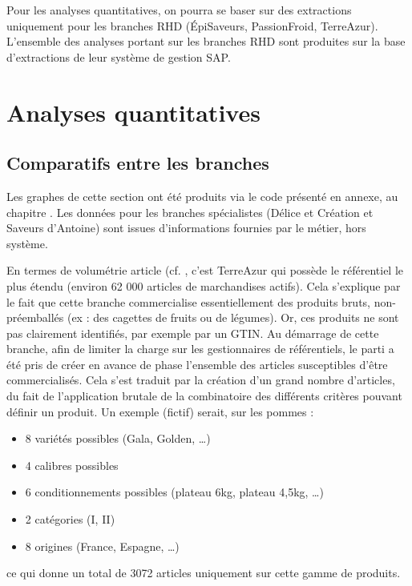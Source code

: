         Pour les analyses quantitatives, on pourra se baser sur des extractions uniquement pour les branches RHD (\'{E}piSaveurs, PassionFroid, TerreAzur).
        L'ensemble des analyses portant sur les branches RHD sont produites sur la base d'extractions de leur système de gestion SAP.

        \section{Analyses quantitatives}
            \subsection{Comparatifs entre les branches}

                Les graphes de cette section ont été produits via le code présenté en annexe, au chapitre .
                Les données pour les branches spécialistes (Délice et Création et Saveurs d'Antoine) sont issues d'informations fournies par le métier, hors système.


                En termes de volumétrie article (cf. , c'est TerreAzur qui possède le référentiel le plus étendu (environ 62 000 articles de marchandises actifs).
                Cela s'explique par le fait que cette branche commercialise essentiellement des produits bruts, non-préemballés (ex : des cagettes de fruits ou de légumes).
                Or, ces produits ne sont pas clairement identifiés, par exemple par un GTIN.
                Au démarrage de cette branche, afin de limiter la charge sur les gestionnaires de référentiels, le parti a été pris de créer en avance de phase l'ensemble des articles susceptibles d'être commercialisés.
                Cela s'est traduit par la création d'un grand nombre d'articles, du fait de l'application \og brutale \fg de la combinatoire des différents critères pouvant définir un produit.
                Un exemple (fictif) serait, sur les pommes : 
                \begin{itemize}
                    \item 8 variétés possibles (Gala, Golden, \dots)
                    \item 4 calibres possibles
                    \item 6 conditionnements possibles (plateau 6kg, plateau 4,5kg, \dots)
                    \item 2 catégories (I, II)
                    \item 8 origines (France, Espagne, \dots)
                \end{itemize}
                ce qui donne un total de 3072 articles uniquement sur cette gamme de produits.

